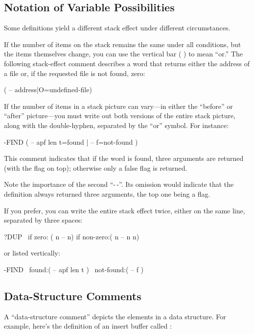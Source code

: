 \subsection{Notation of Variable Possibilities}%
Some definitions yield a different stack effect under different
circumstances.

If the number of items on the stack remains the same under all
conditions, but the items themselves change, you can use the vertical
bar ( \forth{|} ) to mean ``or.'' The following stack-effect comment
describes a word that returns either the address of a file or, if the
requested file is not found, zero:
\begin{Code}
( -- address|O=undefined-file)
\end{Code}
If the number of items in a stack picture can vary---in either the
``before'' or ``after'' picture---you must write out both versions of
the entire stack
picture, along with the double-hyphen, separated by the ``or'' symbol.
For instance:
\begin{Code}
-FIND   ( -- apf len t=found | -- f=not-found )
\end{Code}
This comment indicates that if the word is found, three arguments are
returned (with the flag on top); otherwise only a false flag is
returned.

Note the importance of the second ``-\,-''.  Its omission would indicate
that the definition always returned three arguments, the top one being
a flag.

%
If you prefer, you can write the entire stack effect twice, either on
the same line, separated by three spaces:
\begin{Code}
?DUP   \ if zero: ( n -- n)    if non-zero:( n -- n n)
\end{Code}
or listed vertically:
\begin{Code}
-FIND  \     found:( -- apf len t )
       \ not-found:( -- f )
\end{Code}
%

\subsection{Data-Structure Comments}%

A ``data-structure comment'' depicts the elements in a data structure.
For example, here's the definition of an insert buffer called
 :

